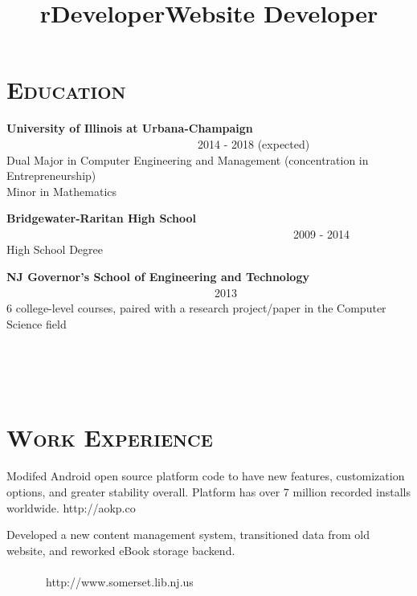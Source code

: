 \begin{resume}

\section{\textsc{Education}}

\textbf{University of Illinois at Urbana-Champaign} \ \ \ \ \ \ \ \ \ \ \ \ \ \ \ \ \ \ \ \ \ \ \ \ \ \ \ \ \ \ \ \ \ \ 2014 - 2018 (expected) \\
Dual Major in Computer Engineering and Management (concentration in Entrepreneurship) \\ Minor in Mathematics

\textbf{Bridgewater-Raritan High School} \ \ \ \ \ \ \ \ \ \ \ \ \ \ \ \ \ \ \ \ \ \ \ \ \ \ \ \ \ \ \ \ \ \ \ \ \ \ \ \ \ \ \ \ \ \ \ \ \ \ \ 2009 - 2014 \\
High School Degree

\textbf{NJ Governor's School of Engineering and Technology} \ \ \ \ \ \ \ \ \ \ \ \ \ \ \ \ \ \ \ \ \ \ \ \ \ \ \ \ \ \ \ \ \ \ \ \ \ 2013 \\ 
6 college-level courses, paired with a research project/paper in the Computer Science field

\begin{formatb}
  \title{r}\\
  \\
  \body\\
\end{formatb}

\section{\textsc{Work Experience}}

\title{Developer}
\begin{position}
Modifed Android open source platform code to have new features, customization options, and greater stability overall. Platform has over 7 million recorded installs worldwide. http://aokp.co
\end{position}

\title{Website Developer}
\begin{position}
Developed a new content management system, transitioned data from old website, and reworked eBook storage backend. \ \ \ \ \ \ \ \ \ \ \ \ \ \ \ \ \ \ \ \ \ \ \ \ \ \ \ \ \ \ \ \ \ \ \ \ \ \ \ \ \ \ \ \ \ \ \ \ \ \ \ \ \ \ \ \ \ \ \ \ \ \ \ \ \ \ \ \ \ \ \ \ \ \ \ \ \ \ \ http://www.somerset.lib.nj.us
\end{position}


\end{resume}
